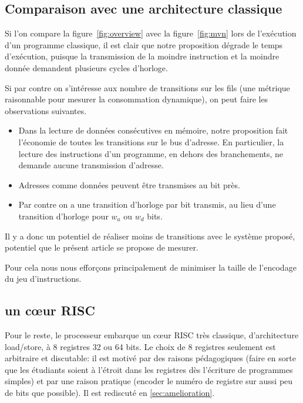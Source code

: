 \documentclass[architecture]{compas2018}
\begin{document}
\subsection{Comparaison avec une architecture classique}
Si l'on compare la figure~\ref{fig:overview} avec la figure~\ref{fig:mvn} lors de l'exécution d'un programme classique, il est clair que notre proposition dégrade le temps d'exécution, puisque la transmission de la moindre instruction et la moindre donnée demandent plusieurs cycles d'horloge.

Si par contre on s'intéresse aux nombre de transitions sur les fils (une métrique raisonnable pour mesurer la consommation dynamique), on peut faire les observations suivantes.

\begin{itemize}
\item Dans la lecture de données consécutives en mémoire, notre proposition fait l'économie de toutes les transitions sur le bus d'adresse.
  En particulier, la lecture des instructions d'un programme, en dehors des branchements,  ne demande aucune transmission d'adresse.
\item Adresses comme données peuvent être transmises au bit près.
\item Par contre on a une transition d'horloge par bit transmis, au lieu d'une transition d'horloge pour $w_a$ ou $w_d$ bits.
\end{itemize}
Il y a donc un potentiel de réaliser moins de transitions avec le système proposé, potentiel que le présent article se propose de mesurer.

Pour cela nous nous efforçons principalement de minimiser la taille de l'encodage du jeu d'instructions.

\subsection{un c\oe ur  RISC}
Pour le reste, le processeur embarque un c\oe ur RISC très classique, d'architecture load/store, à 8 registres 32 ou 64 bits.  
Le choix de 8 registres seulement est arbitraire et discutable: il est motivé par des raisons pédagogiques (faire en sorte que les étudiants soient à l'étroit dans les registres  dès l'écriture de programmes simples) et par une raison pratique (encoder le numéro de registre sur aussi peu de bits que possible).
Il est rediscuté en \ref{sec:amelioration}. 
\end{document}
